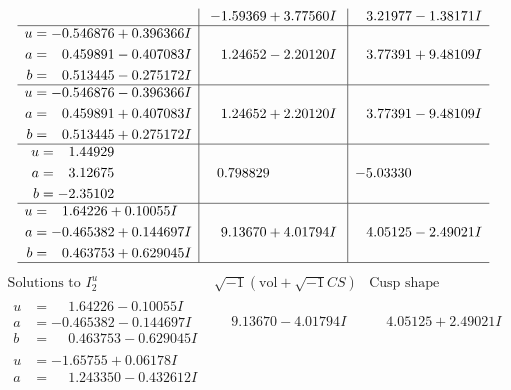 \documentclass[1p]{elsarticle_modified}
\theoremstyle{definition}
\newcommand{\I}{\sqrt{-1}}
\begin{document}
$$\begin{array}{c|c|c}
 & -1.59369 + 3.77560 I & \phantom{-}3.21977 - 1.38171 I \\ \hline\begin{aligned}
u &= -0.546876 + 0.396366 I \\
a &= \phantom{-}0.459891 - 0.407083 I \\
b &= \phantom{-}0.513445 - 0.275172 I\end{aligned}
 & \phantom{-}1.24652 - 2.20120 I & \phantom{-}3.77391 + 9.48109 I \\ \hline\begin{aligned}
u &= -0.546876 - 0.396366 I \\
a &= \phantom{-}0.459891 + 0.407083 I \\
b &= \phantom{-}0.513445 + 0.275172 I\end{aligned}
 & \phantom{-}1.24652 + 2.20120 I & \phantom{-}3.77391 - 9.48109 I \\ \hline\begin{aligned}
u &= \phantom{-}1.44929\phantom{ +0.000000I} \\
a &= \phantom{-}3.12675\phantom{ +0.000000I} \\
b &= -2.35102\phantom{ +0.000000I}\end{aligned}
 & \phantom{-}0.798829\phantom{ +0.000000I} & -5.03330\phantom{ +0.000000I} \\ \hline\begin{aligned}
u &= \phantom{-}1.64226 + 0.10055 I \\
a &= -0.465382 + 0.144697 I \\
b &= \phantom{-}0.463753 + 0.629045 I\end{aligned}
 & \phantom{-}9.13670 + 4.01794 I & \phantom{-}4.05125 - 2.49021 I\\
 \hline 
 \end{array}$$\newpage$$\begin{array}{c|c|c}  
\text{Solutions to }I^u_{2}& \I (\text{vol} + \sqrt{-1}CS) & \text{Cusp shape}\\
 \hline 
\begin{aligned}
u &= \phantom{-}1.64226 - 0.10055 I \\
a &= -0.465382 - 0.144697 I \\
b &= \phantom{-}0.463753 - 0.629045 I\end{aligned}
 & \phantom{-}9.13670 - 4.01794 I & \phantom{-}4.05125 + 2.49021 I \\ \hline\begin{aligned}
u &= -1.65755 + 0.06178 I \\
a &= \phantom{-}1.243350 - 0.432612 I \\

\end{aligned}
\end{array}$$
\end{document}
